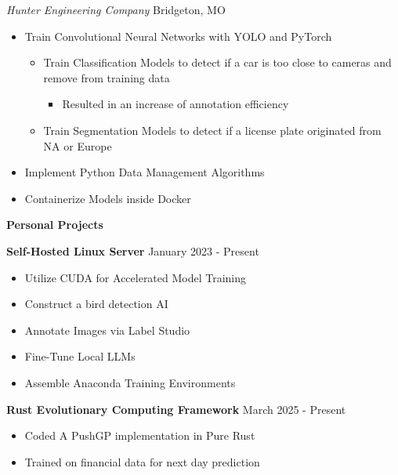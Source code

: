 \documentclass[11pt]{article}
\begin{document}
\textsl{Hunter Engineering Company} \hfill Bridgeton, MO
\begin{itemize}[noitemsep, topsep=0pt, partopsep=0pt, parsep=0pt, itemsep=0pt]
    \item Train Convolutional Neural Networks with YOLO and PyTorch
    \begin{itemize}[noitemsep, topsep=0pt, partopsep=0pt, parsep=0pt, itemsep=0pt]
        \item Train Classification Models to detect if a car is too close to cameras and remove from training data
        \begin{itemize}[noitemsep, topsep=0pt, partopsep=0pt, parsep=0pt, itemsep=0pt]
            \item Resulted in an increase of annotation efficiency
        \end{itemize}
        \item Train Segmentation Models to detect if a license plate originated from NA or Europe
    \end{itemize}
    \item Implement Python Data Management Algorithms
    \item Containerize Models inside Docker
\end{itemize}


\begin{center}
    \textbf{Personal Projects}
\end{center}

\textbf{Self-Hosted Linux Server} \hfill January 2023 - Present
\begin{itemize}[noitemsep, topsep=0pt, partopsep=0pt, parsep=0pt, itemsep=0pt]
    \item Utilize CUDA for Accelerated Model Training
    \item Construct a bird detection AI
    \item Annotate Images via Label Studio
    \item Fine-Tune Local LLMs
    \item Assemble Anaconda Training Environments
\end{itemize}

\textbf{Rust Evolutionary Computing Framework} \hfill March 2025 - Present
\begin{itemize}[noitemsep, topsep=0pt, partopsep=0pt, parsep=0pt, itemsep=0pt]
    \item Coded A PushGP implementation in Pure Rust
    \item Trained on financial data for next day prediction
\end{itemize}
\end{document}
